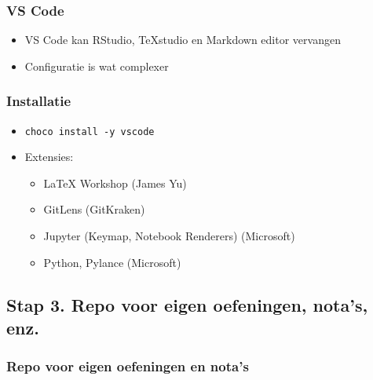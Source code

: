 \documentclass[aspectratio=169]{beamer}
\begin{document}
\begin{frame}
  \frametitle{VS Code}

  \begin{itemize}
    \item VS Code kan RStudio, TeXstudio en Markdown editor vervangen
    \item Configuratie is wat complexer
  \end{itemize}

\end{frame}

\begin{frame}
  \frametitle{Installatie}

  \begin{itemize}
    \item \texttt{choco install -y vscode}
    \item Extensies:
      \begin{itemize}
        \item {\LaTeX} Workshop (James Yu)
        \item GitLens (GitKraken)
        \item Jupyter (Keymap, Notebook Renderers) (Microsoft)
        \item Python, Pylance (Microsoft)
      \end{itemize}
  \end{itemize}

\end{frame}

\subsection{Stap 3. Repo voor eigen oefeningen, nota's, enz.}

\begin{frame}
  \frametitle{Repo voor eigen oefeningen en nota's}


\end{frame}
\end{document}
